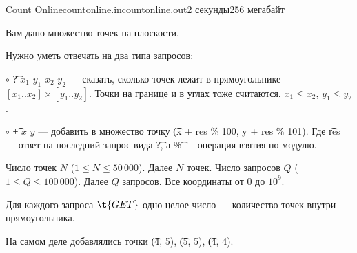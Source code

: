 
\begin{problem}{Count Online}{countonline.in}{countonline.out}{2 секунды}{256 мегабайт}{}

Вам дано множество точек на плоскости.

Нужно уметь отвечать на два типа запросов:

$\circ$ \t{? $x_1$ $y_1$ $x_2$ $y_2$} --- сказать, сколько точек лежит в прямоугольнике $[x_1..x_2] \times [y_1..y_2]$.
Точки на границе и в углах тоже считаются. $x_1 \le x_2$, $y_1 \le y_2$.

$\circ$ \t{+ $x$ $y$} --- добавить в множество точку \t{(x + res \% 100, y + res \% 101)}.
Где \t{res} --- ответ на последний запрос вида \t{?}, а \t{\%} --- операция взятия по модулю.

\InputFile

Число точек $N$ ($1 \le N \le 50\,000$).
Далее $N$ точек.
Число запросов $Q$ ($1 \le Q \le 100\,000$).
Далее $Q$ запросов.
Все координаты от $0$ до $10^9$.

\OutputFile

Для каждого запроса $\t{GET}$ одно целое число --- количество точек внутри прямоугольника.

\Example

\begin{example}
%
\end{example}

\Note

На самом деле добавлялись точки \t{(4, 5)}, \t{(5, 5)}, \t{(4, 4)}.

\end{problem}
